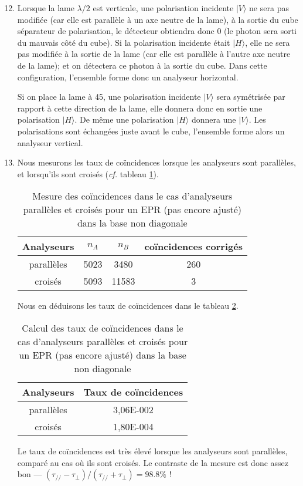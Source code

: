 \documentclass[twocolumn, 10pt]{article}
\newcommand{\ket}[1]{\ensuremath{|#1\rangle}\xspace}
\begin{document}
\begin{enumerate}
\setcounter{enumi}{11}
    \item \par Lorsque la lame $\lambda/2$ est verticale, une polarisation incidente $\ket{V}$ ne sera pas modifiée (car elle est parallèle à un axe neutre de la lame), à la sortie du cube séparateur de polarisation, le détecteur obtiendra donc 0 (le photon sera sorti du mauvais côté du cube). Si la polarisation incidente était $\ket{H}$, elle ne sera pas modifiée à la sortie de la lame (car elle est parallèle à l'autre axe neutre de la lame); et on détectera ce photon à la sortie du cube. Dans cette configuration, l'ensemble forme donc un analyseur horizontal.
    \par Si on place la lame à 45\degres, une polarisation incidente $\ket{V}$ sera symétrisée par rapport à cette direction de la lame, elle donnera donc en sortie une polarisation $\ket{H}$. De même une polarisation $\ket{H}$ donnera une $\ket{V}$. Les polarisations sont échangées juste avant le cube, l'ensemble forme alors un analyseur vertical.

    \item \par Nous mesurons les taux de coïncidences lorsque les analyseurs sont parallèles, et lorsqu'ils sont croisés (\textit{cf.} tableau \ref{nb-EPR-base1}).
\begin{table}[H]
\centering
    \begin{tabular}{||c|c|c|c||}
    \hline
    Analyseurs & $n_A$ & $n_B$ & coïncidences corrigés \\ \hline \hline
    parallèles & 5023 & 3480 & 260 \\ \hline
    croisés & 5093 & 11583 & 3 \\ \hline
    \end{tabular}
\caption{\label{nb-EPR-base1}Mesure des coïncidences dans le cas d'analyseurs parallèles et croisés pour un EPR (pas encore ajusté) dans la base non diagonale} 
\end{table}

    \par Nous en déduisons les taux de coïncidences dans le tableau \ref{taux-EPR-base1}.

\begin{table}[H]
\centering
    \begin{tabular}{||c|c||}
    \hline
    Analyseurs & Taux de coïncidences \\ \hline \hline
    parallèles & 3,06E-002 \\ \hline
    croisés & 1,80E-004 \\ \hline
    \end{tabular}
\caption{\label{taux-EPR-base1}Calcul des taux de coïncidences dans le cas d'analyseurs parallèles et croisés pour un EPR (pas encore ajusté) dans la base non diagonale} 
\end{table}

\par Le taux de coïncidences est très élevé lorsque les analyseurs sont parallèles, comparé au cas où ils sont croisés. Le contraste de la mesure est donc assez bon --- $(\tau_{//} - \tau_{\perp})/(\tau_{//} + \tau_{\perp}) = 98.8\%$ !
\end{enumerate}
\end{document}
